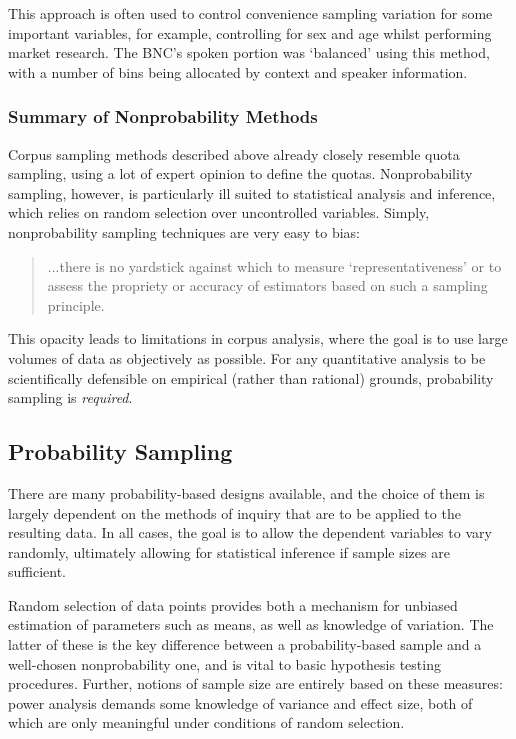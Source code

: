This approach is often used to control convenience sampling variation for some important variables, for example, controlling for sex and age whilst performing market research.  The BNC's spoken portion was `balanced' using this method, with a number of bins being allocated by context and speaker information.




\subsubsection{Summary of Nonprobability Methods}
Corpus sampling methods described above already closely resemble quota sampling, using a lot of expert opinion to define the quotas.  Nonprobability sampling, however, is particularly ill suited to statistical analysis and inference, which relies on random selection over uncontrolled variables.  Simply, nonprobability sampling techniques are very easy to bias\cite[p.19]{barnett1991sample}:

\begin{quote}
...there is no yardstick against which to measure `representativeness' or to assess the propriety or accuracy of estimators based on such a sampling principle.
\end{quote}

This opacity leads to limitations in corpus analysis, where the goal is to use large volumes of data as objectively as possible.  For any quantitative analysis to be scientifically defensible on empirical (rather than rational) grounds, probability sampling is \textsl{required}.




\subsection{Probability Sampling}
There are many probability-based designs available, and the choice of them is largely dependent on the methods of inquiry that are to be applied to the resulting data.  In all cases, the goal is to allow the dependent variables to vary randomly, ultimately allowing for statistical inference if sample sizes are sufficient.

Random selection of data points provides both a mechanism for unbiased estimation of parameters such as means, as well as knowledge of variation.  The latter of these is the key difference between a probability-based sample and a well-chosen nonprobability one, and is vital to basic hypothesis testing procedures.  Further, notions of sample size are entirely based on these measures: power analysis demands some knowledge of variance and effect size, both of which are only meaningful under conditions of random selection.

